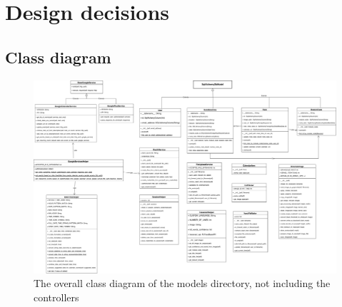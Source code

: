 \chapter{Design decisions}
\label{appendix:design}

\section{Class diagram}
\label{design:class_diagram}
  \begin{figure}
    \includegraphics[scale=0.3]{images/class_diagram.pdf}
    \caption{The overall class diagram of the models directory, not including the controllers}
  \end{figure}
